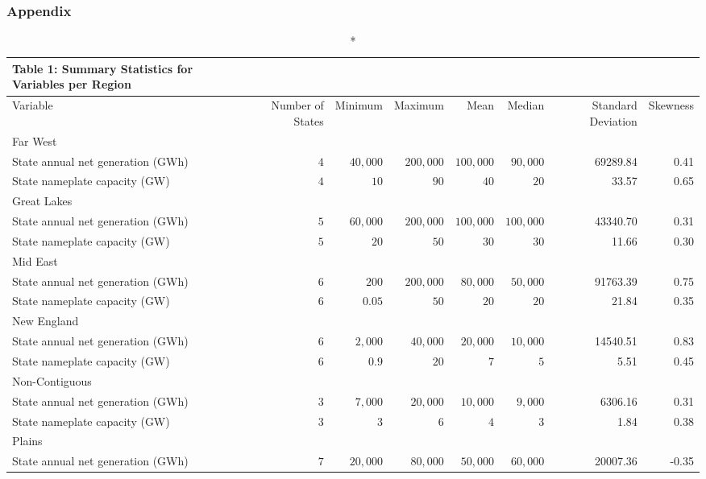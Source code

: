 \documentclass[
]{article}
\begin{document}
\hypertarget{appendix}{%
\subsubsection{Appendix}\label{appendix}}

\begin{longtable}{lrrrrrrr}
\caption*{
{\large Table 1: Summary Statistics for Variables per Region}
} \\ 
\toprule
Variable & Number of States & Minimum & Maximum & Mean & Median & Standard Deviation & Skewness \\ 
\midrule
\multicolumn{8}{l}{Far West} \\ 
\midrule
State annual net generation (GWh) & $4$ & $40,000$ & $200,000$ & $100,000$ & $90,000$ & 69289.84 & 0.41 \\ 
State nameplate capacity (GW) & $4$ & $10$ & $90$ & $40$ & $20$ & 33.57 & 0.65 \\ 
\midrule
\multicolumn{8}{l}{Great Lakes} \\ 
\midrule
State annual net generation (GWh) & $5$ & $60,000$ & $200,000$ & $100,000$ & $100,000$ & 43340.70 & 0.31 \\ 
State nameplate capacity (GW) & $5$ & $20$ & $50$ & $30$ & $30$ & 11.66 & 0.30 \\ 
\midrule
\multicolumn{8}{l}{Mid East} \\ 
\midrule
State annual net generation (GWh) & $6$ & $200$ & $200,000$ & $80,000$ & $50,000$ & 91763.39 & 0.75 \\ 
State nameplate capacity (GW) & $6$ & $0.05$ & $50$ & $20$ & $20$ & 21.84 & 0.35 \\ 
\midrule
\multicolumn{8}{l}{New England} \\ 
\midrule
State annual net generation (GWh) & $6$ & $2,000$ & $40,000$ & $20,000$ & $10,000$ & 14540.51 & 0.83 \\ 
State nameplate capacity (GW) & $6$ & $0.9$ & $20$ & $7$ & $5$ & 5.51 & 0.45 \\ 
\midrule
\multicolumn{8}{l}{Non-Contiguous} \\ 
\midrule
State annual net generation (GWh) & $3$ & $7,000$ & $20,000$ & $10,000$ & $9,000$ & 6306.16 & 0.31 \\ 
State nameplate capacity (GW) & $3$ & $3$ & $6$ & $4$ & $3$ & 1.84 & 0.38 \\ 
\midrule
\multicolumn{8}{l}{Plains} \\ 
\midrule
State annual net generation (GWh) & $7$ & $20,000$ & $80,000$ & $50,000$ & $60,000$ & 20007.36 & -0.35 \\ 

\end{longtable}
\end{document}
